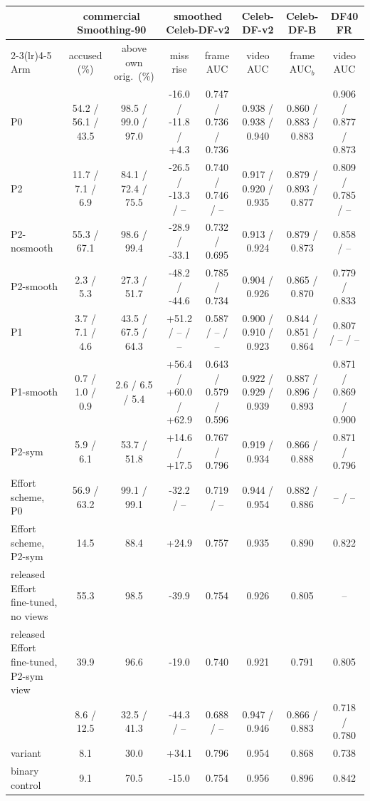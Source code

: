 \begin{tabular}{@{}l cc cc c c c@{}}
\toprule
 & \multicolumn{2}{c}{commercial Smoothing-90} & \multicolumn{2}{c}{smoothed Celeb-DF-v2} & Celeb-DF-v2 & Celeb-DF-B & DF40 FR \\
\cmidrule(lr){2-3}\cmidrule(lr){4-5}
Arm & accused (\%) & above own orig.\ (\%) & miss rise & frame AUC & video AUC & frame AUC$_b$ & video AUC \\
\midrule
P0 & 54.2 / 56.1 / 43.5 & 98.5 / 99.0 / 97.0 & -16.0 / -11.8 / +4.3 & 0.747 / 0.736 / 0.736 & 0.938 / 0.938 / 0.940 & 0.860 / 0.883 / 0.883 & 0.906 / 0.877 / 0.873 \\
P2 & 11.7 / 7.1 / 6.9 & 84.1 / 72.4 / 75.5 & -26.5 / -13.3 / -- & 0.740 / 0.746 / -- & 0.917 / 0.920 / 0.935 & 0.879 / 0.893 / 0.877 & 0.809 / 0.785 / -- \\
P2-nosmooth & 55.3 / 67.1 & 98.6 / 99.4 & -28.9 / -33.1 & 0.732 / 0.695 & 0.913 / 0.924 & 0.879 / 0.873 & 0.858 / -- \\
P2-smooth & 2.3 / 5.3 & 27.3 / 51.7 & -48.2 / -44.6 & 0.785 / 0.734 & 0.904 / 0.926 & 0.865 / 0.870 & 0.779 / 0.833 \\
P1 & 3.7 / 7.1 / 4.6 & 43.5 / 67.5 / 64.3 & +51.2 / -- / -- & 0.587 / -- / -- & 0.900 / 0.910 / 0.923 & 0.844 / 0.851 / 0.864 & 0.807 / -- / -- \\
P1-smooth & 0.7 / 1.0 / 0.9 & 2.6 / 6.5 / 5.4 & +56.4 / +60.0 / +62.9 & 0.643 / 0.579 / 0.596 & 0.922 / 0.929 / 0.939 & 0.887 / 0.896 / 0.893 & 0.871 / 0.869 / 0.900 \\
P2-sym & 5.9 / 6.1 & 53.7 / 51.8 & +14.6 / +17.5 & 0.767 / 0.796 & 0.919 / 0.934 & 0.866 / 0.888 & 0.871 / 0.796 \\
Effort scheme, P0 & 56.9 / 63.2 & 99.1 / 99.1 & -32.2 / -- & 0.719 / -- & 0.944 / 0.954 & 0.882 / 0.886 & -- / -- \\
Effort scheme, P2-sym & 14.5 & 88.4 & +24.9 & 0.757 & 0.935 & 0.890 & 0.822 \\
released Effort fine-tuned, no views & 55.3 & 98.5 & -39.9 & 0.754 & 0.926 & 0.805 & -- \\
released Effort fine-tuned, P2-sym view & 39.9 & 96.6 & -19.0 & 0.740 & 0.921 & 0.791 & 0.805 \\
\ours{} & 8.6 / 12.5 & 32.5 / 41.3 & -44.3 / -- & 0.688 / -- & 0.947 / 0.946 & 0.866 / 0.883 & 0.718 / 0.780 \\
\ours{} variant & 8.1 & 30.0 & +34.1 & 0.796 & 0.954 & 0.868 & 0.738 \\
binary control & 9.1 & 70.5 & -15.0 & 0.754 & 0.956 & 0.896 & 0.842 \\
\bottomrule
\end{tabular}
